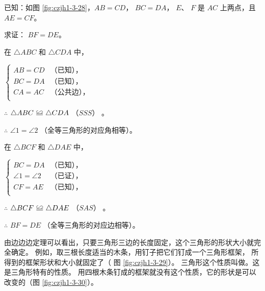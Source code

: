 \liti[0] 已知：如图 \ref{fig:czjh1-3-28}，$AB = CD$， $BC = DA$， $E$、 $F$ 是 $AC$ 上两点，且 $AE = CF$。

求证： $BF = DE$。

\zhengming 在 $\triangle ABC$ 和 $\triangle CDA$ 中，

\hspace{2em}$\begin{cases}
    AB = CD & \text{（已知），} \\
    BC = DA & \text{（已知），} \\
    CA = AC & \text{（公共边），} \\
\end{cases}$

$\therefore$ \quad $\triangle ABC \quandeng \triangle CDA$ （$SSS$） 。

$\therefore$ \quad $\angle 1 = \angle 2$ （全等三角形的对应角相等）。

在 $\triangle BCF$ 和 $\triangle DAE$ 中，

\hspace{2em}$\begin{cases}
    BC = DA  & \text{（已知），} \\
    \angle 1 = \angle 2 & \text{（已证），} \\
    CF = AE & \text{（已知），} \\
\end{cases}$

$\therefore$ \quad $\triangle BCF \quandeng \triangle DAE$ （$SAS$） 。

$\therefore$ \quad $BF = DE$ （全等三角形的对应边相等）。


由边边边定理可以看出，只要三角形三边的长度固定，这个三角形的形状大小就完全确定。
例如，取三根长度适当的木条，用钉子把它们钉成一个三角形框架，
所得到的框架形状和大小就固定了（ 图 \ref{fig:czjh1-3-29}）。
三角形这个性质叫做。这是三角形特有的性质。
用四根木条钉成的框架就没有这个性质，它的形状是可以改变的（图 \ref{fig:czjh1-3-30}）。

